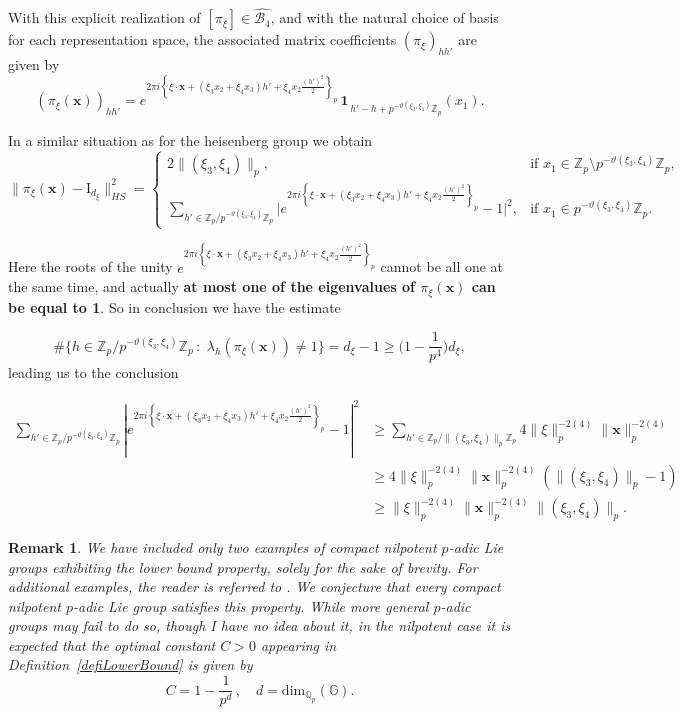 \documentclass[12pt, reqno]{amsart}
\newtheorem{rem}[defi]{Remark}
\newcommand{\1}{\mathds{1}}
\begin{document}
With this explicit realization of $[\pi_\xi]\in\widehat{\mathcal{B}_4}$,
and with the natural choice of basis for each representation space,
the associated matrix coefficients $(\pi_\xi)_{hh'}$ are given by
\[
(\pi_\xi(\mathbf{x}))_{hh'}
=
e^{2\pi i
\left\{
\xi\cdot \mathbf{x}
+
(\xi_3x_2+\xi_4x_3)h'
+
\xi_4x_2\frac{(h')^2}{2}
\right\}_p}
\,
\mathbf{1}_{\,h'-h+p^{- \vartheta (\xi_3,\xi_4)}\mathbb{Z}_p}(x_1).
\]

In a similar situation as for the heisenberg group we obtain 
\[
\|\pi_\xi(\mathbf{x}) - \mathrm{I}_{d_\xi}\|^2_{HS} =
\begin{cases}
2\| (\xi_3 , \xi_4) \|_p, & \text{if } x_1 \in \mathbb{Z}_p \setminus p^{-\vartheta(\xi_3, \xi_4)}\mathbb{Z}_p, \\[6pt]
\displaystyle \sum_{h' \in \mathbb{Z}_p / p^{-\vartheta(\xi_3, \xi_4)} \mathbb{Z}_p}
\Big| e^{2\pi i
\left\{
\xi\cdot \mathbf{x}
+
(\xi_3x_2+\xi_4x_3)h'
+
\xi_4x_2\frac{(h')^2}{2}
\right\}_p} - 1 \Big|^2, & 
\text{if } x_1 \in p^{-\vartheta(\xi_3, \xi_4)}\mathbb{Z}_p.
\end{cases}
\]

Here the roots of the unity $e^{2\pi i
\left\{
\xi\cdot \mathbf{x}
+
(\xi_3x_2+\xi_4x_3)h'
+
\xi_4x_2\frac{(h')^2}{2}
\right\}_p}$ cannot be all one at the same time, and actually \textbf{at most one of the eigenvalues of $\pi_\xi (\mathbf{x})$ can be equal to 1}. So in conclusion we have the estimate

$$\# \{ h \in \mathbb{Z}_p / p^{-\vartheta(\xi_3, \xi_4)} \mathbb{Z}_p \, :  \,\, \lambda_h (\pi_\xi (\mathbf{x})) \neq 1 \}= d_\xi -1 \geq \big( 1 -\frac{1}{p^{4}} \big)  d_\xi, $$
leading us to the conclusion

\begin{align*}
\sum_{ h' \in \mathbb{Z}_p / p^{-\vartheta(\xi_3, \xi_4)} \mathbb{Z}_p } 
\left| e^{2\pi i
\left\{
\xi\cdot \mathbf{x}
+
(\xi_3x_2+\xi_4x_3)h'
+
\xi_4x_2\frac{(h')^2}{2}
\right\}_p} - 1 \right|^2 
&\geq \sum_{h' \in \mathbb{Z}_p / \|(\xi_3, \xi_4) \|_p \mathbb{Z}_p}
4 \|\xi\|_p^{-2(4)} \|\mathbf{x}\|_p^{-2(4)} \\
&\geq  4 \|\xi\|_p^{-2(4)} \|\mathbf{x}\|_p^{-2(4)} (\|(\xi_3, \xi_4) \|_p - 1) \\
&\geq \|\xi\|_p^{-2(4)} \|\mathbf{x}\|_p^{-2(4)} \|(\xi_3, \xi_4 ) \|_p .
\end{align*}


\begin{rem}
    We have included only two examples of compact nilpotent \(p\)-adic Lie groups exhibiting the lower bound property, solely for the sake of brevity. For additional examples, the reader is referred to \cite{VelasquezRodriguez2025}. We conjecture that \emph{every compact nilpotent \(p\)-adic Lie group satisfies this property}. While more general \(p\)-adic groups may fail to do so, though I have no idea about it, in the nilpotent case it is expected that the optimal constant \(C>0\) appearing in Definition~\ref{defiLowerBound} is given by
\[
C = 1 - \frac{1}{p^d} \, , \quad d = \mathrm{dim}_{\mathbb{Q}_p}(\mathbb{G}).
\]
\end{rem}
\end{document}

